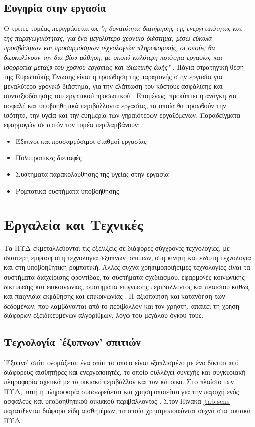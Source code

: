 \subsection{Ευγηρία στην εργασία}
Ο τρίτος τομέας περιγράφεται ως \textit{"η δυνατότητα διατήρησης της ενεργητικότητας και της παραγωγικότητας, για ένα μεγαλύτερο χρονικό διάστημα, μέσω εύκολα προσβάσιμων και προσαρμόσιμων τεχνολογιών πληροφορικής, οι οποίες θα διευκολύνουν την δια βίου μάθηση, με σκοπό καλύτερη ποιότητα εργασίας και ισορροπία μεταξύ του χρόνου εργασίας και ιδιωτικής ζωής"} \cite{broek}.
Πάγια στρατηγική θέση της Ευρωπαϊκής Ένωσης είναι η προώθηση της παραμονής στην εργασία για μεγαλύτερο χρονικό διάστημα, για την ελάττωση του κόστους ασφάλισης και συνταξιοδότησης του εργατικού προσωπικού \cite{morschhauser2006healthy}\cite{dubois2019extending}.
Επομένως, προκύπτει η ανάγκη για ασφαλή και υποβοηθητικά περιβάλλοντα εργασίας, τα οποία θα προωθούν την ισότητα, την υγεία και την ευημερία των γηραιότερων εργαζόμενων.
Παραδείγματα εφαρμογών σε αυτόν τον τομέα περιλαμβάνουν:
\begin{itemize}
    \item Έξυπνοι και προσαρμόσιμοι σταθμοί εργασίας
    \item Πολυτροπικές διεπαφές
    \item Συστήματα παρακολούθησης της υγείας στην εργασία
    \item Ρομποτικά συστήματα υποβοήθησης
\end{itemize}{}
\section{Εργαλεία και Τεχνικές}
Τα ΠΥΔ εκμεταλλεύονται τις εξελίξεις σε διάφορες σύγχρονες τεχνολογίες, με ιδιαίτερη έμφαση στη τεχνολογία 'έξυπνων' σπιτιών, στη κινητή και ένδυτη τεχνολογία και στη υποβοηθητική ρομποτική. Άλλες συχνά χρησιμοποιήσιμες τεχνολογίες είναι τα συστήματα διαχείρισης φροντίδας, τα συστήματα σχεδιασμού, εφαρμογές κοινωνικής δικτύωσης και επικοινωνίας, συστήματα επίγνωσης περιβάλλοντος και πλαισίου καθώς και παιχνίδια εκμάθησης και επικοινωνίας \cite{rashidi2012survey}.
Η αξιοποίησή και κατανόηση των δεδομένων, που λαμβάνονται από το περιβάλλον και τον χρήστη, απαιτεί τη χρήση διάφορων εξειδικευμένων αλγορίθμων, λόγω του μεγάλου όγκου τους.
\subsection{Τεχνολογία 'έξυπνων' σπιτιών}
'Έξυπνο' σπίτι ονομάζεται ένα σπίτι το οποίο είναι εξοπλισμένο με ένα δίκτυο από διάφορους αισθητήρες και ενεργοποιητές, το οποίο συλλέγει συνεχής και συγκυριακή πληροφορία σχετικά με το οικιακό περιβάλλον και τον κάτοικο.
Στο πλαίσιο των ΠΥΔ, αυτή η πληροφορία συσσωρεύεται και χρησιμοποιείται για την παροχή ενός ασφαλούς και υποβοηθητικού οικιακού περιβάλλοντος \cite{rashidi2012survey}\cite{Liu2016}\cite{Demiris2008}.
Στον Πίνακα \ref{tab:sens} παρατίθενται διάφορα είδη αισθητήρων, τα οποία χρησιμοποιούνται συχνά στα οικιακά ΠΥΔ.

